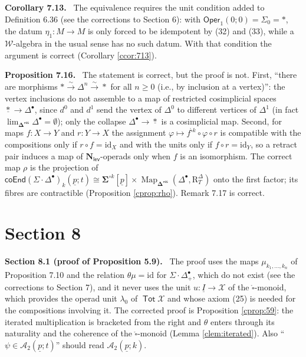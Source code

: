\documentclass[12pt]{article}
\theoremstyle{plain}
\theoremstyle{definition}
\theoremstyle{remark}
\newcommand{\Cal}[1]{\mathcal{#1}}
\newcommand{\Tot}{\operatorname{\mathsf{Tot}}}
\newcommand{\Nl}{\mathbf{N}_{\mathsf{lev}}}
\newcommand{\Oper}{\mathsf{Oper}}
\newcommand{\coend}[1]{\mathsf{coEnd}(#1)}
\newcommand{\bdel}{\mathbf{\Delta}}
\newcommand{\Dres}{\bdel^{\mathsf{res}}}
\newcommand{\boxcirc}{\mathring{\square}}
\newcommand{\SD}{\Sigma{\cdot}\Delta^{\bullet}}
\newcommand{\pt}{*}
\newcommand{\id}{\mathrm{id}}
\newcommand{\Map}{\operatorname{Map}}
\newcommand{\Rr}{\mathrm{R}}
\newcommand{\corr}[1]{\par\smallskip\noindent\textbf{#1.}\ }
\begin{document}
\corr{Corollary 7.13} The equivalence requires the unit condition added to Definition 6.36 (see the corrections to Section 6): with $\Oper_1(0;0)=\Sigma_0=\pt$, the datum $\eta_1\colon M\to M$ is only forced to be idempotent by (32) and (33), while a $\Cal W$-algebra in the usual sense has no such datum. With that condition the argument is correct (Corollary \ref{ccor:713}).

\corr{Proposition 7.16} The statement is correct, but the proof is not. First, ``there are morphisms $\pt\xrightarrow{\sim}\Delta^n\xrightarrow{\sim}\pt$ for all $n\geq0$ (i.e., by inclusion at a vertex)'': the vertex inclusions do not assemble to a map of restricted cosimplicial spaces $\underline\pt\to\Delta^\bullet$, since $d^0$ and $d^1$ send the vertex of $\Delta^0$ to different vertices of $\Delta^1$ (in fact $\lim_{\Dres}\Delta^\bullet=\emptyset$); only the collapse $\Delta^\bullet\to\underline\pt$ is a cosimplicial map. Second, for maps $f\colon X\to Y$ and $r\colon Y\to X$ the assignment $\varphi\mapsto f^{\boxcirc k}\circ\varphi\circ r$ is compatible with the compositions only if $r\circ f=\id_X$ and with the units only if $f\circ r=\id_Y$, so a retract pair induces a map of $\Nl$-operads only when $f$ is an isomorphism. The correct map $\rho$ is the projection of $\coend{\SD}_k(\underline p;t)\cong\mathbf\Sigma^{\circ k}[\underline p]\times\Map_{\Dres}(\Delta^\bullet,\Rr^\Delta_T)$ onto the first factor; its fibres are contractible (Proposition \ref{cprop:rho}). Remark 7.17 is correct.

\section*{Section 8}
\label{sec:s8}

\corr{Section 8.1 (proof of Proposition 5.9)} The proof uses the maps $\mu_{k_1,\dots,k_n}$ of Proposition 7.10 and the relation $\theta\mu=\id$ for $\SD_+$, which do not exist (see the corrections to Section 7), and it never uses the unit $u\colon\underline I\to\Cal X$ of the $\boxcirc$-monoid, which provides the operad unit $\lambda_0$ of $\Tot\Cal X$ and whose axiom (25) is needed for the compositions involving it. The corrected proof is Proposition \ref{cprop:59}: the iterated multiplication is bracketed from the right and $\theta$ enters through its naturality and the coherence of the $\boxcirc$-monoid (Lemma \ref{clem:iterated}). Also ``$\psi\in\Cal A_2(\underline p;t)$'' should read $\Cal A_2(\underline p;k)$.
\end{document}
